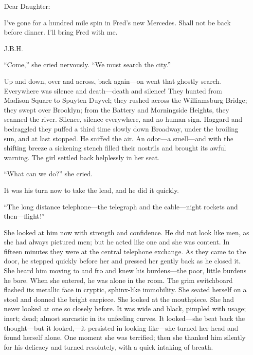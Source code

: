 \hspace{2em}Dear Daughter:

\hspace{2em}I've gone for a hundred mile spin in Fred's new Mercedes. Shall
not be back before dinner. I'll bring Fred with me.

\hspace{2em}J.B.H.

``Come,'' she cried nervously. ``We must search the city.''

Up and down, over and across, back again---on went that ghostly
search. Everywhere was silence and death---death and silence! They
hunted from Madison Square to Spuyten Duyvel; they rushed across
the Williamsburg Bridge; they swept over Brooklyn; from the
Battery and Morningside Heights, they scanned the river. Silence,
silence everywhere, and no human sign. Haggard and bedraggled
they puffed a third time slowly down Broadway, under the
broiling sun, and at last stopped. He sniffed the air. An odor---a
smell---and with the shifting breeze a sickening stench filled
their nostrils and brought its awful warning. The girl settled
back helplessly in her seat.

``What can we do?'' she cried.

It was his turn now to take the lead, and he did it quickly.

``The long distance telephone---the telegraph and the cable---night
rockets and then---flight!''

She looked at him now with strength and confidence. He did not
look like men, as she had always pictured men; but he acted like
one and she was content. In fifteen minutes they were at the
central telephone exchange. As they came to the door, he stepped
quickly before her and pressed her gently back as he closed it.
She heard him moving to and fro and knew his burdens---the poor,
little burdens he bore. When she entered, he was alone in the
room. The grim switchboard flashed its metallic face in cryptic,
sphinx-like immobility. She seated herself on a stool and donned
the bright earpiece. She looked at the mouthpiece. She had never
looked at one so closely before. It was wide and black, pimpled
with usage; inert; dead; almost sarcastic in its unfeeling
curves. It looked---she beat back the thought---but it looked,---it
persisted in looking like---she turned her head and found herself
alone. One moment she was terrified; then she thanked him
silently for his delicacy and turned resolutely, with a quick
intaking of breath.

